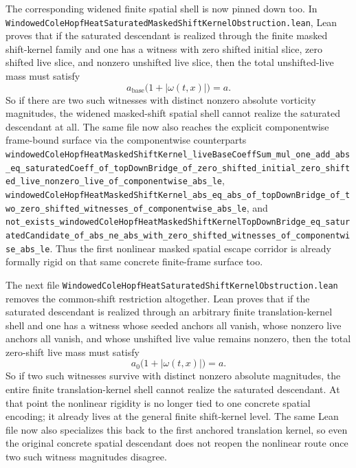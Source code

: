 \documentclass[11pt]{article}
\theoremstyle{remark}
\begin{document}
The corresponding widened finite spatial shell is now pinned down too.  In
\texttt{WindowedColeHopfHeatSaturatedMaskedShiftKernelObstruction.lean}, Lean
proves that if the saturated descendant is realized through the finite masked
shift-kernel family and one has a witness with zero shifted initial slice, zero
shifted live slice, and nonzero unshifted live slice, then the total
unshifted-live mass must satisfy
\[
  a_{\mathrm{base}} \bigl(1 + |\omega(t,x)|\bigr) = a.
\]
So if there are two such witnesses with distinct nonzero absolute vorticity
magnitudes, the widened masked-shift spatial shell cannot realize the saturated
descendant at all.  The same file now also reaches the explicit componentwise
frame-bound surface via the componentwise counterparts
\texttt{windowedColeHopfHeatMaskedShiftKernel\_liveBaseCoeffSum\_mul\_one\_add\_abs\_eq\_saturatedCoeff\_of\_topDownBridge\_of\_zero\_shifted\_initial\_zero\_shifted\_live\_nonzero\_live\_of\_componentwise\_abs\_le},
\texttt{windowedColeHopfHeatMaskedShiftKernel\_abs\_eq\_abs\_of\_topDownBridge\_of\_two\_zero\_shifted\_witnesses\_of\_componentwise\_abs\_le},
and
\texttt{not\_exists\_windowedColeHopfHeatMaskedShiftKernelTopDownBridge\_eq\_saturatedCandidate\_of\_abs\_ne\_abs\_with\_zero\_shifted\_witnesses\_of\_componentwise\_abs\_le}.
Thus the first nonlinear masked spatial escape corridor is already formally
rigid on that same concrete finite-frame surface too.

The next file
\texttt{WindowedColeHopfHeatSaturatedShiftKernelObstruction.lean} removes the
common-shift restriction altogether.  Lean proves that if the saturated
descendant is realized through an arbitrary finite translation-kernel shell and
one has a witness whose seeded anchors all vanish, whose nonzero live anchors
all vanish, and whose unshifted live value remains nonzero, then the total
zero-shift live mass must satisfy
\[
  a_{0} \bigl(1 + |\omega(t,x)|\bigr) = a.
\]
So if two such witnesses survive with distinct nonzero absolute magnitudes, the
entire finite translation-kernel shell cannot realize the saturated descendant.
At that point the nonlinear rigidity is no longer tied to one concrete spatial
encoding; it already lives at the general finite shift-kernel level.  The same
Lean file now also specializes this back to the first anchored translation
kernel, so even the original concrete spatial descendant does not reopen the
nonlinear route once two such witness magnitudes disagree.
\end{document}
